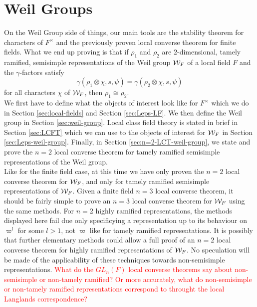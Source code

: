 \section{Weil Groups}
On the Weil Group side of things, our main tools are the stability theorem for characters of $F^\times$ and the previously proven local converse theorem for finite fields.
What we end up proving is that if $\rho_1$ and $\rho_2$ are $2$-dimensional, tamely ramified, semisimple representations of the Weil group $\mathcal{W}_F$ of a local field $F$ and the $\gamma$-factors satisfy
\[\gamma(\rho_1 \otimes \chi, s, \psi) = \gamma(\rho_2 \otimes \chi, s, \psi)\]
for all characters $\chi$ of $\mathcal{W}_F$, then $\rho_1 \cong \rho_2$.
\\

We first have to define what the objects of interest look like for $F^\times$ which we do in Section \ref{sec:local-fields} and Section \ref{sec:Leps-LF}.
We then define the Weil group in Section \ref{sec:weil-group}.
Local class field theory is stated in brief in Section \ref{sec:LCFT} which we can use to the objects of interest for $\mathcal{W}_F$ in Section \ref{sec:Leps-weil-group}.
Finally, in Section \ref{sec:n=2-LCT-weil-group}, we state and prove the $n=2$ local converse theorem for tamely ramified semisimple representations of the Weil group.
\\

Like for the finite field case, at this time we have only proven the $n=2$ local converse theorem for $\mathcal{W}_F$, and only for tamely ramified semisimple representations of $\mathcal{W}_F$.
Given a finite field $n=3$ local converse theorem, it should be fairly simple to prove an $n=3$ local converse theorem for $\mathcal{W}_F$ using the same methods.
For $n=2$ highly ramified representations, the methods displayed here fail due only specificying a representation up to its behaviour on $\varpi^l$ for some $l > 1$, not $\varpi$ like for tamely ramified representations.
It is possibly that further elementary methods could allow a full proof of an $n=2$ local converse theorem for highly ramified representations of $\mathcal{W}_F$.
No speculation will be made of the applicability of these techniques towards non-semisimple representations.
\textcolor{red}{What do the $GL_n(F)$ local converse theorems say about non-semisimple or non-tamely ramified? Or more accurately, what do non-semisimple or non-tamely ramified representations correspond to throught the local Langlands correspondence?}
\\
\endinput
